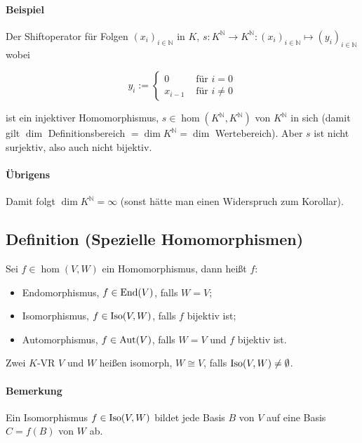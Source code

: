 \paragraph{Beispiel}
	Der Shiftoperator für Folgen $(x_i)_{i\in \mathbb{N}}$ in $K$, $s: K^{\mathbb{N}} \to K^{\mathbb{N}}: (x_i)_{i\in \mathbb{N}} \mapsto (y_i)_{i\in \mathbb{N}}$ wobei
	
	\begin{equation*}
		y_i :=
		\begin{cases}
			0 &\text{ für } i = 0\\
			x_{i-1} &\text{ für } i \neq 0
		\end{cases}
	\end{equation*}
			
	ist ein injektiver Homomorphismus, $s\in \hom(K^\mathbb{N},K^\mathbb{N})$ von $K^\mathbb{N}$ in sich (damit gilt $\dim $ Definitionsbereich $= \dim K^\mathbb{N}= \dim$ Wertebereich). Aber $s$ ist nicht surjektiv, also auch nicht bijektiv.
	
\paragraph{Übrigens}
	Damit folgt $\dim K^\mathbb{N} =\infty$ (sonst hätte man einen Widerspruch zum Korollar).
		
\subsection{Definition (Spezielle Homomorphismen)}
	\begin{Definition}
		Sei $f\in \hom(V,W)$ ein Homomorphismus, dann heißt $f$:
	\begin{itemize}
		\item Endomorphismus, $f\in \operatorname{End} (V)$, falls $W = V$;
		\item Isomorphismus, $f\in \operatorname{Iso}(V,W)$, falls $f$ bijektiv ist;
		\item Automorphismus, $f\in \operatorname{Aut}(V)$, falls $W=V$ und $f$ bijektiv ist.
	\end{itemize}
	
	Zwei $K$-VR $V$ und $W$ heißen isomorph, $W \cong V$, falls $\operatorname{Iso}(V,W) \neq \emptyset$.
	\end{Definition}

\paragraph{Bemerkung}
	Ein Isomorphismus $f\in \operatorname{Iso}(V,W)$ bildet jede Basis $B$ von $V$ auf eine Basis $C = f(B)$ von $W$ ab.
	

